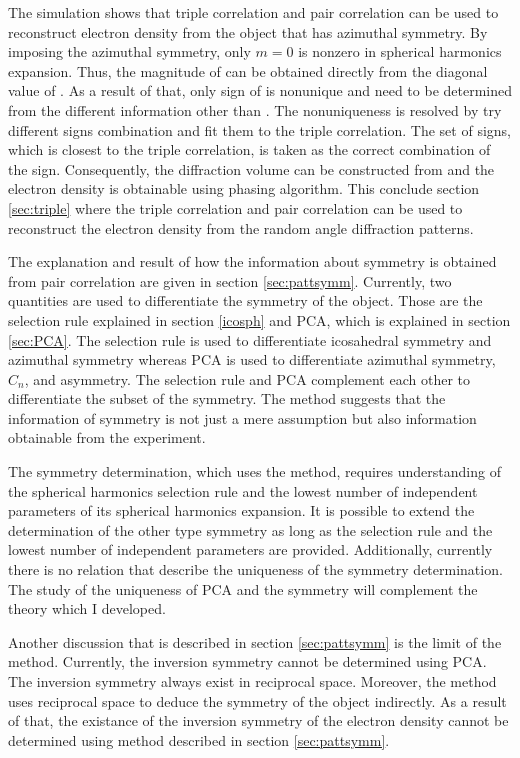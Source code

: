 The simulation shows that triple correlation and pair correlation can be used to reconstruct electron density from the object that has azimuthal symmetry. By imposing the azimuthal symmetry, only $m=0$ is nonzero in spherical harmonics expansion. Thus, the magnitude of \Ilm can be obtained directly from the diagonal value of \Blq. As a result of that, only sign of \Ilm is nonunique and need to be determined from the different information other than \Blq. The nonuniqueness is resolved by try different signs combination and fit them to the triple correlation. The set of signs, which is closest to the triple correlation, is taken as the correct combination of the sign. Consequently, the diffraction volume can be constructed from \Ilm and the electron density is obtainable using phasing algorithm. This conclude section \ref{sec:triple} where the triple correlation and pair correlation can be used to reconstruct the electron density from the random angle diffraction patterns. 

The explanation and result of how the information about symmetry is obtained from pair correlation are given in section \ref{sec:pattsymm}. Currently, two quantities are used to differentiate the symmetry of the object. Those are the selection rule explained in section \ref{icosph} and PCA, which is explained in section \ref{sec:PCA}. The selection rule is used to differentiate icosahedral symmetry and azimuthal symmetry whereas PCA is used to differentiate azimuthal symmetry, $C_n$, and asymmetry. The selection rule and PCA complement each other to differentiate the subset of the symmetry. The method suggests that the information of symmetry is not just a mere assumption but also information obtainable from the experiment.

The symmetry determination, which uses the method, requires understanding of the spherical harmonics selection rule and the lowest number of independent parameters of its spherical harmonics expansion. It is possible to extend the determination of the other type symmetry as long as the selection rule and the lowest number of independent parameters are provided. Additionally, currently there is no relation that describe the uniqueness of the symmetry determination. The study of the uniqueness of PCA and the symmetry will complement the theory which I developed.      

Another discussion that is described in section \ref{sec:pattsymm} is the limit of the method. Currently, the inversion symmetry cannot be determined using PCA. The inversion symmetry always exist in reciprocal space. Moreover, the method uses reciprocal space to deduce the symmetry of the object indirectly. As a result of that, the existance of the inversion symmetry of the electron density cannot be determined using method described in section \ref{sec:pattsymm}.

